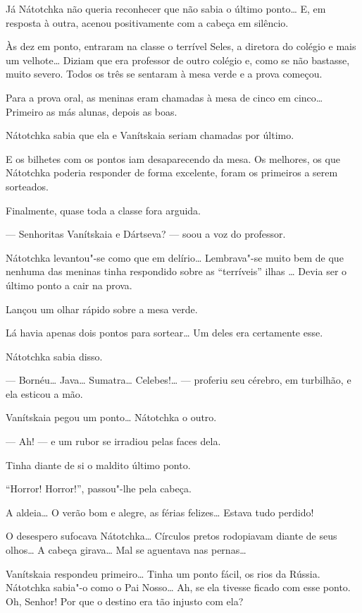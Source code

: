 Já Nátotchka não queria reconhecer que não sabia o último ponto\ldots{} E, em
resposta à outra, acenou positivamente com a cabeça em silêncio.

Às dez em ponto, entraram na classe o terrível Seles, a diretora do
colégio e mais um velhote\ldots{} Diziam que era professor de outro colégio
e, como se não bastasse, muito severo. Todos os três se sentaram à mesa
verde e a prova começou.

Para a prova oral, as meninas eram chamadas à mesa de cinco em cinco\ldots{}
Primeiro as más alunas, depois as boas.

Nátotchka sabia que ela e Vanítskaia seriam chamadas por último.

E os bilhetes com os pontos iam desaparecendo da mesa. Os melhores, os
que Nátotchka poderia responder de forma excelente, foram os primeiros a
serem sorteados.

Finalmente, quase toda a classe fora arguida.

--- Senhoritas Vanítskaia e Dártseva? --- soou a voz do professor.

Nátotchka levantou"-se como que em delírio\ldots{} Lembrava"-se muito bem de
que nenhuma das meninas tinha respondido sobre as ``terríveis'' ilhas
\ldots{} Devia ser o último ponto a cair na prova.

Lançou um olhar rápido sobre a mesa verde.

Lá havia apenas dois pontos para sortear\ldots{} Um deles era certamente
esse.

Nátotchka sabia disso.

--- Bornéu\ldots{} Java\ldots{} Sumatra\ldots{} Celebes!\ldots{} --- proferiu seu cérebro,
em turbilhão, e ela esticou a mão.

Vanítskaia pegou um ponto\ldots{} Nátotchka o outro.

--- Ah! --- e um rubor se irradiou pelas faces dela.

Tinha diante de si o maldito último ponto.

``Horror! Horror!'', passou"-lhe pela cabeça.

A aldeia\ldots{} O verão bom e alegre, as férias felizes\ldots{} Estava tudo
perdido!

O desespero sufocava Nátotchka\ldots{} Círculos pretos rodopiavam diante de
seus olhos\ldots{} A cabeça girava\ldots{} Mal se aguentava nas pernas\ldots{}

Vanítskaia respondeu primeiro\ldots{} Tinha um ponto fácil, os rios da
Rússia. Nátotchka sabia"-o como o Pai Nosso\ldots{} Ah, se ela tivesse ficado
com esse ponto. Oh, Senhor! Por que o destino era tão injusto com ela?

